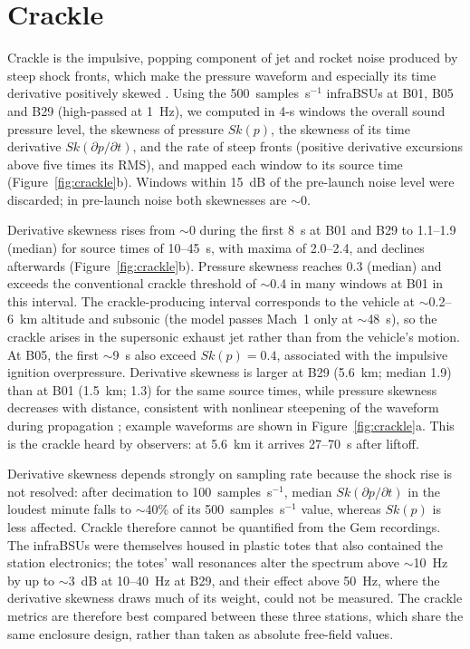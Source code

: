 \documentclass[]{seismica}
\begin{document}
\section{Crackle}
\label{sec:crackle}

Crackle is the impulsive, popping component of jet and rocket noise
produced by steep shock fronts, which make the pressure waveform and
especially its time derivative positively skewed
\citep{FfowcsWilliams1975,Gee2013,McInerny1996}. Using the
500~samples~s$^{-1}$ infraBSUs at B01, B05 and B29 (high-passed at
1~Hz), we computed in 4-s windows the overall sound pressure level, the
skewness of pressure $Sk(p)$, the skewness of its time derivative
$Sk(\partial p/\partial t)$, and the rate of steep fronts (positive
derivative excursions above five times its RMS), and mapped each window
to its source time (Figure~\ref{fig:crackle}b). Windows within 15~dB of
the pre-launch noise level were discarded; in pre-launch noise both
skewnesses are $\sim$0.

Derivative skewness rises from $\sim$0 during the first 8~s at B01 and
B29 to 1.1--1.9 (median) for source times of 10--45~s, with maxima of
2.0--2.4, and declines afterwards (Figure~\ref{fig:crackle}b). Pressure
skewness reaches 0.3 (median) and exceeds the conventional crackle
threshold of $\sim$0.4 \citep{FfowcsWilliams1975} in many windows at
B01 in this interval. The crackle-producing interval corresponds to the
vehicle at $\sim$0.2--6~km altitude and subsonic (the model passes
Mach~1 only at $\sim$48~s), so the crackle arises in the supersonic
exhaust jet rather than from the vehicle's motion. At B05, the
first $\sim$9~s also exceed $Sk(p) = 0.4$, associated with the impulsive
ignition overpressure. Derivative skewness is larger at B29 (5.6~km;
median 1.9) than at B01 (1.5~km; 1.3) for the same source times, while
pressure skewness decreases with distance, consistent with nonlinear
steepening of the waveform during propagation \citep{Gee2008}; example
waveforms are shown in Figure~\ref{fig:crackle}a. This is the crackle heard by
observers: at 5.6~km it arrives 27--70~s after liftoff.

Derivative skewness depends strongly on sampling rate because the shock
rise is not resolved: after decimation to 100~samples~s$^{-1}$, median
$Sk(\partial p/\partial t)$ in the loudest minute falls to
$\sim$40\% of its 500~samples~s$^{-1}$ value, whereas $Sk(p)$ is less
affected. Crackle therefore cannot be quantified from the Gem
recordings. The infraBSUs were themselves housed in plastic totes that also
contained the station electronics; the totes' wall resonances alter the
spectrum above $\sim$10~Hz by up to $\sim$3~dB at 10--40~Hz at B29, and
their effect above 50~Hz, where the derivative skewness draws much of its
weight, could not be measured. The crackle metrics are therefore best
compared between these three stations, which share the same enclosure
design, rather than taken as absolute free-field values.
\end{document}
